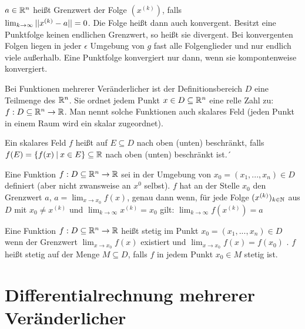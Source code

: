 \begin{definition}[Grenzwerte]
	$a \in \mathbb{R}^n$ heißt Grenzwert der Folge $(x^{(k)})$, falls \\ $\lim_{k \rightarrow \infty} ||x^{(k)} - a|| = 0$. Die Folge heißt dann auch konvergent. Besitzt eine Punktfolge keinen endlichen Grenzwert, so heißt sie divergent.
	Bei konvergenten Folgen liegen in jeder $\epsilon$ Umgebung von $g$ fast alle Folgenglieder und nur endlich viele außerhalb. Eine Punktfolge konvergiert nur dann, wenn sie kompontenweise konvergiert.
\end{definition}

\begin{definition}
	Bei Funktionen mehrerer Veränderlicher ist der Definitionsbereich $D$ eine Teilmenge des $\mathbb{R}^n$. Sie ordnet 
	jedem Punkt $x \in D \subseteq \mathbb{R}^n$ eine relle Zahl zu: $f : D \subseteq \mathbb{R}^n \rightarrow \mathbb{R}$. Man nennt solche Funktionen auch skalares Feld (jeden Punkt in einem Raum wird ein skalar zugeordnet). 
	
	Ein skalares Feld $f$ heißt auf $E \subseteq D$ nach oben (unten) beschränkt, falls $f(E) = \{f(x) \medspace | \medspace x \in E\} \subseteq \mathbb{R}$  nach oben (unten) beschränkt ist.´ 
\end{definition}

\begin{definition}
	Eine Funktion $f : D \subseteq \mathbb{R}^n \rightarrow \mathbb{R}$ sei in der Umgebung von $x_0 = (x_1, ..., x_n) \in D$ definiert (aber nicht zwansweise an $x^0$ selbst). $f$ hat an der Stelle  $x_0$ den Grenzwert $a$, $a = \lim_{x \rightarrow x_0} f(x)$, genau dann wenn, für jede Folge $(x^{(k)})_{k \in \mathbb{N}}$ aus $D$ mit $x_0 \neq x^{(k)}$ und $\lim_{k \rightarrow \infty} x^{(k)} = x_0$ gilt: $\lim_{k \rightarrow \infty} f(x^{(k)}) = a$
\end{definition}

\begin{definition}[Stetigkeit]
		Eine Funktion $f : D \subseteq \mathbb{R}^n \rightarrow \mathbb{R}$  heißt stetig im Punkt $x_0 = (x_1, ..., x_n) \in D$ wenn der Grenzwert $\lim_{x \rightarrow x_0} f(x)$ existiert und $\lim_{x \rightarrow x_0} f(x) = f(x_0)$ . $f$ heißt stetig auf der Menge $M \subseteq D$, falls $f$ in jedem Punkt $x_0 \in M$ stetig ist.
\end{definition}

\pagebreak

\section{Differentialrechnung mehrerer Veränderlicher}

